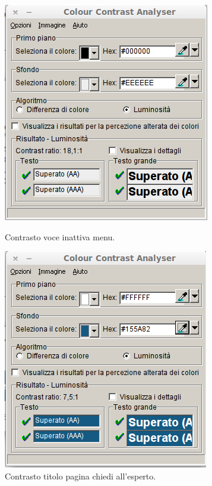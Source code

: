 \documentclass[a4paper]{article}
\begin{document}
\begin{figure}[htbp]
\begin{minipage}[b]{0.47\textwidth}
\vfill
\includegraphics[width=\textwidth]{test/contrasto/Test_Menu_Inactive.png}
\caption{\label{f_etichetta}Contrasto voce inattiva menu.}
\end{minipage}
\hfill
\begin{minipage}[b]{0.47\textwidth}
\includegraphics[width=\textwidth]{test/contrasto/Test_Title_Chiedi.png}
\caption{\label{f_etichetta}Contrasto titolo pagina chiedi all'esperto.}
\end{minipage}
\end{figure}
\end{document}
